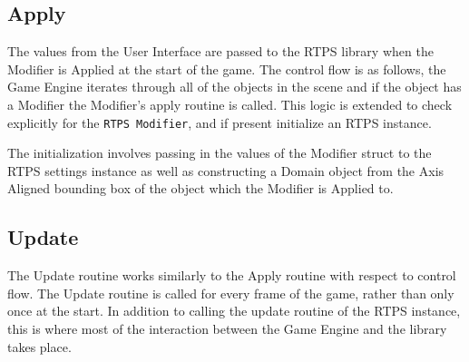 \subsection{Apply}
The values from the User Interface are passed to the RTPS library when the
Modifier is Applied at the start of the game. The control flow is as follows,
the Game Engine iterates through all of the objects in the scene and if the
object has a Modifier the Modifier's apply routine is called. This logic is
extended to check explicitly for the \verb|RTPS Modifier|, and if present initialize
an RTPS instance.


The initialization involves passing in the values of the Modifier struct to the
RTPS settings instance as well as constructing a Domain object from the Axis
Aligned bounding box of the object which the Modifier is Applied to.

\subsection{Update}

The Update routine works similarly to the Apply routine with respect to control
flow. The Update routine is called for every frame of the game, rather than
only once at the start. In addition to calling the update routine of the RTPS
instance, this is where most of the interaction between the Game Engine and the
library takes place.

